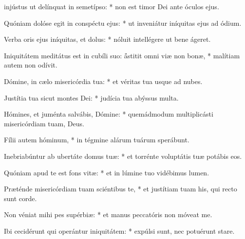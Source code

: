 \begin{psalmus}
    
     injústus ut delínquat in semetípso: * non est timor Dei ante óculos ejus.
		
		Quóniam dolóse egit in conspéctu ejus: * ut inveniátur iníquitas ejus ad ódium.
		
		Verba oris ejus iníquitas, et dolus: * nóluit intellégere ut bene ágeret.
		
		Iniquitátem meditátus est in cubíli suo: \f ástitit omni viæ non bonæ, * malítiam autem non odívit.
		
		Dómine, in cælo misericórdia tua: * et véritas tua usque ad nubes.
		
		Justítia tua sicut montes Dei: * judícia tua abýssus multa.
		
		Hómines, et juménta salvábis, Dómine: * quemádmodum multiplicásti misericórdiam tuam, Deus.
		
		Fílii autem hóminum, * in tégmine alárum tuárum sperábunt.
		
		Inebriabúntur ab ubertáte domus tuæ: * et torrénte voluptátis tuæ potábis eos.
		
		Quóniam apud te est fons vitæ: * et in lúmine tuo vidébimus lumen.
		
		Præténde misericórdiam tuam sciéntibus te, * et justítiam tuam his, qui recto sunt corde.
		
		Non véniat mihi pes supérbiæ: * et manus peccatóris non móveat me.
		
		Ibi cecidérunt qui operántur iniquitátem: * expúlsi sunt, nec potuérunt stare.

\end{psalmus}
